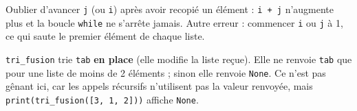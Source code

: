 \documentclass[11pt, a4paper]{exam}
\newcommand{\code}[1]{\texttt{#1}}
\begin{document}
\begin{erreur}
Oublier d'avancer \code{j} (ou \code{i}) après avoir recopié un élément : \code{i + j} n'augmente plus et la boucle \code{while} ne s'arrête jamais. Autre erreur : commencer \code{i} ou \code{j} à 1, ce qui saute le premier élément de chaque liste.
\end{erreur}

\begin{remarque}
\code{tri\_fusion} trie \code{tab} \textbf{en place} (elle modifie la liste reçue). Elle ne renvoie \code{tab} que pour une liste de moins de 2 éléments ; sinon elle renvoie \code{None}. Ce n'est pas gênant ici, car les appels récursifs n'utilisent pas la valeur renvoyée, mais \code{print(tri\_fusion([3, 1, 2]))} affiche \code{None}.
\end{remarque}
\end{document}

